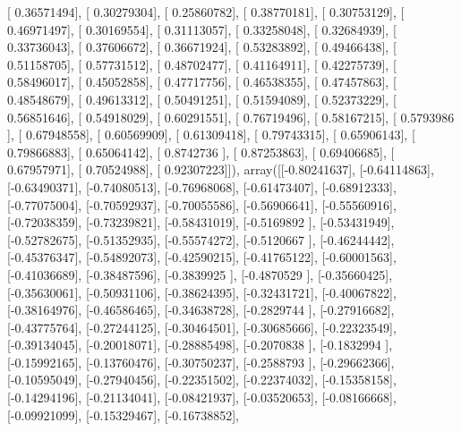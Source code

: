 \documentclass{article}
\begin{document}
       [ 0.36571494],
       [ 0.30279304],
       [ 0.25860782],
       [ 0.38770181],
       [ 0.30753129],
       [ 0.46971497],
       [ 0.30169554],
       [ 0.31113057],
       [ 0.33258048],
       [ 0.32684939],
       [ 0.33736043],
       [ 0.37606672],
       [ 0.36671924],
       [ 0.53283892],
       [ 0.49466438],
       [ 0.51158705],
       [ 0.57731512],
       [ 0.48702477],
       [ 0.41164911],
       [ 0.42275739],
       [ 0.58496017],
       [ 0.45052858],
       [ 0.47717756],
       [ 0.46538355],
       [ 0.47457863],
       [ 0.48548679],
       [ 0.49613312],
       [ 0.50491251],
       [ 0.51594089],
       [ 0.52373229],
       [ 0.56851646],
       [ 0.54918029],
       [ 0.60291551],
       [ 0.76719496],
       [ 0.58167215],
       [ 0.5793986 ],
       [ 0.67948558],
       [ 0.60569909],
       [ 0.61309418],
       [ 0.79743315],
       [ 0.65906143],
       [ 0.79866883],
       [ 0.65064142],
       [ 0.8742736 ],
       [ 0.87253863],
       [ 0.69406685],
       [ 0.67957971],
       [ 0.70524988],
       [ 0.92307223]]), array([[-0.80241637],
       [-0.64114863],
       [-0.63490371],
       [-0.74080513],
       [-0.76968068],
       [-0.61473407],
       [-0.68912333],
       [-0.77075004],
       [-0.70592937],
       [-0.70055586],
       [-0.56906641],
       [-0.55560916],
       [-0.72038359],
       [-0.73239821],
       [-0.58431019],
       [-0.5169892 ],
       [-0.53431949],
       [-0.52782675],
       [-0.51352935],
       [-0.55574272],
       [-0.5120667 ],
       [-0.46244442],
       [-0.45376347],
       [-0.54892073],
       [-0.42590215],
       [-0.41765122],
       [-0.60001563],
       [-0.41036689],
       [-0.38487596],
       [-0.3839925 ],
       [-0.4870529 ],
       [-0.35660425],
       [-0.35630061],
       [-0.50931106],
       [-0.38624395],
       [-0.32431721],
       [-0.40067822],
       [-0.38164976],
       [-0.46586465],
       [-0.34638728],
       [-0.2829744 ],
       [-0.27916682],
       [-0.43775764],
       [-0.27244125],
       [-0.30464501],
       [-0.30685666],
       [-0.22323549],
       [-0.39134045],
       [-0.20018071],
       [-0.28885498],
       [-0.2070838 ],
       [-0.1832994 ],
       [-0.15992165],
       [-0.13760476],
       [-0.30750237],
       [-0.2588793 ],
       [-0.29662366],
       [-0.10595049],
       [-0.27940456],
       [-0.22351502],
       [-0.22374032],
       [-0.15358158],
       [-0.14294196],
       [-0.21134041],
       [-0.08421937],
       [-0.03520653],
       [-0.08166668],
       [-0.09921099],
       [-0.15329467],
       [-0.16738852],
\end{document}
